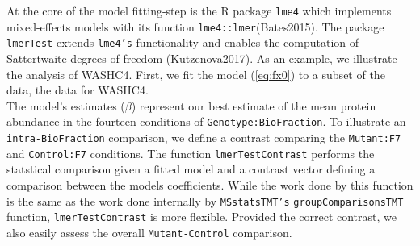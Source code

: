 \documentclass[11pt]{elife}\usepackage[]{graphicx}\usepackage[]{color}
\begin{document}
At the core of the model fitting-step is the R package \texttt{lme4} which
implements mixed-effects models with its function \texttt{lme4::lmer}(Bates2015). The
package \texttt{lmerTest} extends \texttt{lme4's} functionality and enables the
computation of Sattertwaite degrees of freedom (Kutzenova2017). As an example,
we illustrate the analysis of WASHC4. First, we fit the model (\ref{eq:fx0}) to
a subset of the data, the data for WASHC4.\\


%
%
%
%
%
%



The model's estimates ($\beta$) represent our best estimate of the mean protein
abundance in the fourteen conditions of \texttt{Genotype:BioFraction}. 
To illustrate an \texttt{intra-BioFraction} comparison, we 
define a contrast comparing the \texttt{Mutant:F7} and \texttt{Control:F7}
conditions. The function \texttt{lmerTestContrast} performs the statstical comparison given
a fitted model and a contrast vector defining a comparison between the models
coefficients. While the work done by this function 
is the same as the work done internally by \texttt{MSstatsTMT's}
\texttt{groupComparisonsTMT} function, \texttt{lmerTestContrast} is more
flexible. Provided the correct contrast, we also easily assess the overall
\texttt{Mutant-Control} comparison.\\


%
%
%
%
%
%
%
%
\end{document}
